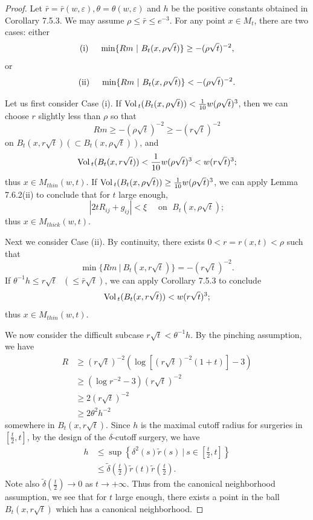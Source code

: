 \begin{proof}
Let $\bar{r}=\bar{r}(w,\varepsilon),\theta=\theta(w,\varepsilon)$
and $h$ be the positive constants obtained in Corollary 7.5.3. We
may assume $\rho\leq\bar{r} \leq e^{-3}$. For any point $x\in
M_t$, there are two cases: either
$$
{\rm (i)}\ \ \ \mbox{ } \min\{Rm\ |\ B_t(x,\rho\sqrt{t})\}\geq
-(\rho\sqrt{t})^{-2},
$$
or
$$
{\rm (ii)}\ \ \ \mbox{    } \min\{Rm\ |\
B_t(x,\rho\sqrt{t})\}<-(\rho\sqrt{t})^{-2}.$$

Let us first consider Case (i). If
${\rm Vol}\,_t(B_t(x,\rho\sqrt{t}))<\frac{1}{10}w(\rho\sqrt{t})^3$, then
we can choose $r$ slightly less than $\rho$ so that
$$
Rm\geq -(\rho\sqrt{t})^{-2}\geq -(r\sqrt{t})^{-2}
$$
on $B_t(x,r\sqrt{t})(\subset B_t(x,\rho\sqrt{t}))$, and
$$
{\rm Vol}\,_t(B_t(x,r\sqrt{t}))<\frac{1}{10}w(\rho\sqrt{t})^3<w(r\sqrt{t})^3;
$$
thus $x\in M_{thin}(w,t)$. If ${\rm Vol}\,_t(B_t(x,\rho\sqrt{t}))\geq
\frac{1}{10}w(\rho\sqrt{t})^3$, we can apply Lemma 7.6.2(ii) to
conclude that for $t$ large enough,
$$
|2tR_{ij}+g_{ij}|<\xi \quad \mbox{ on }\; B_t(x,\rho\sqrt{t});
$$
thus $x\in M_{thick}(w,t)$.

Next we consider Case (ii). By continuity, there exists
$0<r=r(x,t)<\rho$ such that \begin{equation}
\min\{Rm\ |\ B_t(x,r\sqrt{t})\}=-(r\sqrt{t})^{-2}. %
\end{equation} If $\theta^{-1}h\leq r\sqrt{t}\mbox{  }(\leq
\bar{r}\sqrt{t})$, we can apply Corollary 7.5.3 to conclude
$$
{\rm Vol}\,_t(B_t(x,r\sqrt{t}))<w(r\sqrt{t})^3;
$$
thus $x\in M_{thin}(w,t)$.

We now consider the difficult subcase $\mbox{}r\sqrt{t}
<\theta^{-1}h$. By the pinching assumption, we have
\begin{align*}
R &  \geq (r\sqrt{t})^{-2}(\log[(r\sqrt{t})^{-2}(1+t)] -3)\\
&  \geq (\log r^{-2}-3)(r\sqrt{t})^{-2}\\
&  \geq 2(r\sqrt{t})^{-2}\\
&  \geq 2\theta^{2}h^{-2}
\end{align*}
somewhere in $B_t(x,r\sqrt{t})$. Since $h$ is the maximal cutoff
radius for surgeries in $[\frac{t}{2},t]$, by the design of the
$\delta$-cutoff surgery, we have
\begin{align*}
 h &  \leq \sup \left\{{\delta}^2(s)\widetilde{r}(s)\ |\ s\in
\left[\frac{t}{2},t\right]\right\}\\
& \leq\widetilde{\delta}\left(\frac{t}{2}\right)
\widetilde{r}(t)\widetilde{r}\left(\frac{t}{2}\right).
\end{align*}
Note also $\widetilde{\delta}(\frac{t}{2})\rightarrow0$ as
$t\rightarrow+\infty$. Thus from the canonical neighborhood
assumption, we see that for $t$ large enough, there exists a point
in the ball $B_t(x,r\sqrt{t})$ which has a canonical neighborhood.


\end{proof}
